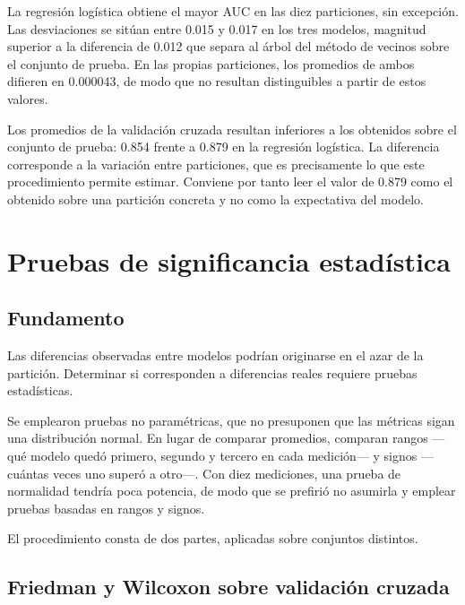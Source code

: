 \documentclass[11pt]{article}
\begin{document}


La regresión logística obtiene el mayor AUC en las diez particiones, sin excepción. Las
desviaciones se sitúan entre 0.015 y 0.017 en los tres modelos, magnitud superior a la diferencia
de 0.012 que separa al árbol del método de vecinos sobre el conjunto de prueba. En las propias
particiones, los promedios de ambos difieren en 0.000043, de modo que no resultan distinguibles a
partir de estos valores.

Los promedios de la validación cruzada resultan inferiores a los obtenidos sobre el conjunto de
prueba: 0.854 frente a 0.879 en la regresión logística. La diferencia corresponde a la variación
entre particiones, que es precisamente lo que este procedimiento permite estimar. Conviene por
tanto leer el valor de 0.879 como el obtenido sobre una partición concreta y no como la
expectativa del modelo.

\section{Pruebas de significancia estadística}

\subsection{Fundamento}

Las diferencias observadas entre modelos podrían originarse en el azar de la partición. Determinar
si corresponden a diferencias reales requiere pruebas estadísticas.

Se emplearon pruebas no paramétricas, que no presuponen que las métricas sigan una distribución
normal. En lugar de comparar promedios, comparan rangos —qué modelo quedó primero, segundo y
tercero en cada medición— y signos —cuántas veces uno superó a otro—. Con diez mediciones, una prueba de
normalidad tendría poca potencia, de modo que se prefirió no asumirla y emplear pruebas basadas en
rangos y signos.

El procedimiento consta de dos partes, aplicadas sobre conjuntos distintos.

\subsection{Friedman y Wilcoxon sobre validación cruzada}
\end{document}
